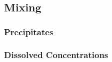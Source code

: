 \subsection{Mixing}

\subsubsection{Precipitates}

\subsubsection{Dissolved Concentrations}

\subsubsection{}



